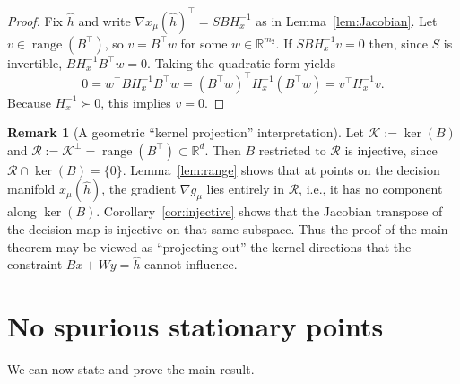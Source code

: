 \documentclass[11pt]{article}
\newcommand{\R}{\mathbb{R}}
\DeclareMathOperator{\range}{range}
\DeclareMathOperator{\kerop}{ker}
\theoremstyle{plain}
\theoremstyle{definition}
\newtheorem{remark}{Remark}
\begin{document}
\begin{proof}
Fix $\hat h$ and write $\nabla x_\mu(\hat h)^\top = S B H_x^{-1}$ as in Lemma~\ref{lem:Jacobian}.
Let $v\in\range(B^\top)$, so $v=B^\top w$ for some $w\in\R^{m_2}$. If $S B H_x^{-1} v=0$ then, since
$S$ is invertible, $B H_x^{-1}B^\top w=0$. Taking the quadratic form yields
\[
0 = w^\top BH_x^{-1}B^\top w = (B^\top w)^\top H_x^{-1}(B^\top w)=v^\top H_x^{-1}v.
\]
Because $H_x^{-1}\succ 0$, this implies $v=0$.
\end{proof}

\begin{remark}[A geometric ``kernel projection'' interpretation]\label{rem:kernel}
Let $\mathcal{K}:=\kerop(B)$ and $\mathcal{R}:=\mathcal{K}^\perp=\range(B^\top)\subset\R^d$.
Then $B$ restricted to $\mathcal{R}$ is injective, since $\mathcal{R}\cap\kerop(B)=\{0\}$.
Lemma~\ref{lem:range} shows that at points on the decision manifold $x_\mu(\hat h)$,
the gradient $\nabla g_\mu$ lies entirely in $\mathcal{R}$, i.e., it has no component along $\kerop(B)$.
Corollary~\ref{cor:injective} shows that the Jacobian transpose of the decision map is injective on that same
subspace. Thus the proof of the main theorem may be viewed as ``projecting out'' the kernel directions
that the constraint $Bx+Wy=\hat h$ cannot influence.
\end{remark}

\section{No spurious stationary points}

We can now state and prove the main result.
\end{document}
